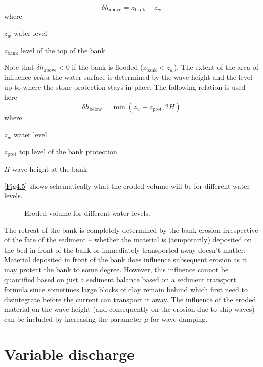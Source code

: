 \begin{equation}
\delta h_\text{above} = z_\text{bank} - z_w
\end{equation}
%
where
%
\begin{symbollist}
\item[$z_w$] water level 
\item[$z_\text{bank}$] level of the top of the bank 
\end{symbollist}
%
Note that $\delta h_\text{above} < 0$ if the bank is flooded ($z_\text{bank} < z_w$).
The extent of the area of influence \emph{below} the water surface is determined by the wave height and the level up to where the stone protection stays in place.
The following relation is used here
%
\begin{equation}
\delta h_\text{below} = \min ( z_w - z_\text{prot}, 2 H )
\end{equation}
%
where
%
\begin{symbollist}
\item[$z_w$] water level 
\item[$z_\text{prot}$] top level of the bank protection 
\item[$H$] wave height at the bank 
\end{symbollist}
%
\autoref{Fig4.5} shows schematically what the eroded volume will be for different water levels.

\begin{figure}
\resizebox{\columnwidth}{!}{
   
}
\caption{Eroded volume for different water levels.}
\label{Fig4.5}
\end{figure}

The retreat of the bank is completely determined by the bank erosion irrespective of the fate of the sediment -- whether the material is (temporarily) deposited on the bed in front of the bank or immediately transported away doesn't matter.
Material deposited in front of the bank does influence subsequent erosion as it may protect the bank to some degree.
However, this influence cannot be quantified based on just a sediment balance based on a sediment transport formula since sometimes large blocks of clay remain behind which first need to disintegrate before the current can transport it away.
The influence of the eroded material on the wave height (and consequently on the erosion due to ship waves) can be included by increasing the parameter $\mu$ for wave damping.

\section{Variable discharge}\label{Sec4.5}

